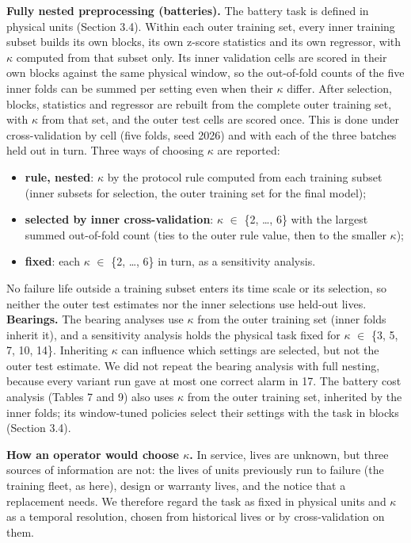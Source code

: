 \documentclass[a4paper,fleqn,doubleblind]{cas-dc}
\begin{document}
\textbf{Fully nested preprocessing (batteries).} The battery task is defined in physical units (Section 3.4). Within each outer training set, every inner training subset builds its own blocks, its own z-score statistics and its own regressor, with $\kappa$ computed from that subset only. Its inner validation cells are scored in their own blocks against the same physical window, so the out-of-fold counts of the five inner folds can be summed per setting even when their $\kappa$ differ. After selection, blocks, statistics and regressor are rebuilt from the complete outer training set, with $\kappa$ from that set, and the outer test cells are scored once. This is done under cross-validation by cell (five folds, seed 2026) and with each of the three batches held out in turn. Three ways of choosing $\kappa$ are reported:

\begin{itemize}[leftmargin=1.2em,itemsep=2pt]
\item \textbf{rule, nested}: $\kappa$ by the protocol rule computed from each training subset (inner subsets for selection, the outer training set for the final model);
\item \textbf{selected by inner cross-validation}: $\kappa$ $\in$ \{2, \ldots{}, 6\} with the largest summed out-of-fold count (ties to the outer rule value, then to the smaller $\kappa$);
\item \textbf{fixed}: each $\kappa$ $\in$ \{2, \ldots{}, 6\} in turn, as a sensitivity analysis.
\end{itemize}

No failure life outside a training subset enters its time scale or its selection, so neither the outer test estimates nor the inner selections use held-out lives. \textbf{Bearings.} The bearing analyses use $\kappa$ from the outer training set (inner folds inherit it), and a sensitivity analysis holds the physical task fixed for $\kappa$ $\in$ \{3, 5, 7, 10, 14\}. Inheriting $\kappa$ can influence which settings are selected, but not the outer test estimate. We did not repeat the bearing analysis with full nesting, because every variant run gave at most one correct alarm in 17. The battery cost analysis (Tables 7 and 9) also uses $\kappa$ from the outer training set, inherited by the inner folds; its window-tuned policies select their settings with the task in blocks (Section 3.4).

\textbf{How an operator would choose $\kappa$.} In service, lives are unknown, but three sources of information are not: the lives of units previously run to failure (the training fleet, as here), design or warranty lives, and the notice that a replacement needs. We therefore regard the task as fixed in physical units and $\kappa$ as a temporal resolution, chosen from historical lives or by cross-validation on them.
\end{document}
